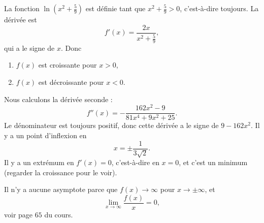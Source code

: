 \begin{corrige}{4}

La fonction  $\ln(x^2+\frac{ 5 }{ 9 })$ est définie tant que $x^2+\frac{ 5 }{ 9 }>0$, c'est-à-dire toujours. La dérivée est
\begin{equation}
	f'(x)=\frac{ 2x }{ x^2+\frac{ 5 }{ 9 } },
\end{equation}
qui a le signe de $x$. Donc
\begin{enumerate}

\item $f(x)$ est croissante pour $x>0$,
\item $f(x)$ est décroissante pour $x<0$.
\end{enumerate}

Nous calculons la dérivée seconde :
\begin{equation}
	f''(x)=-\frac{ 162 x^2 -9}{ 81x^4+9x^2+25 }.
\end{equation}
Le dénominateur est toujours positif, donc cette dérivée a le signe de $9-162 x^2$. Il y a un point d'inflexion en
\begin{equation}
	x=\pm\frac{ 1 }{ 3\sqrt{2} }.
\end{equation}
Il y a un extrémum en $f'(x)=0$, c'est-à-dire en $x=0$, et c'est un minimum (regarder la croissance pour le voir).

Il n'y a aucune asymptote parce que $f(x)\to \infty$ pour $x\to\pm\infty$, et 
\begin{equation}
	\lim_{x\to\infty}\frac{ f(x) }{ x }=0,
\end{equation}
voir page $65$ du cours.

%

\end{corrige}
